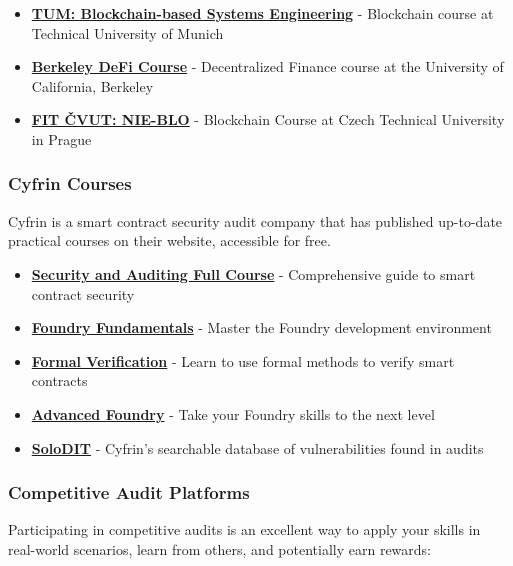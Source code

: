 \documentclass[12pt]{article}
\begin{document}
\begin{itemize}
    \item \textbf{\href{https://github.com/sebischair/bbse}{TUM: Blockchain-based Systems Engineering}} - Blockchain course at Technical University of Munich
    \item \textbf{\href{https://rdi.berkeley.edu/berkeley-defi/f24}{Berkeley DeFi Course}} - Decentralized Finance course at the University of California, Berkeley
    \item \textbf{\href{https://courses.fit.cvut.cz/NIE-BLO/index.html}{FIT ČVUT: NIE-BLO}} - Blockchain Course at Czech Technical University in Prague
\end{itemize}

\subsubsection*{Cyfrin Courses}

Cyfrin is a smart contract security audit company that has published up-to-date practical courses on their website, accessible for free.

\begin{itemize}
    \item \textbf{\href{https://updraft.cyfrin.io/courses/security}{Security and Auditing Full Course}} - Comprehensive guide to smart contract security
    \item \textbf{\href{https://updraft.cyfrin.io/courses/foundry}{Foundry Fundamentals}} - Master the Foundry development environment
    \item \textbf{\href{https://updraft.cyfrin.io/courses/formal-verification}{Formal Verification}} - Learn to use formal methods to verify smart contracts
    \item \textbf{\href{https://updraft.cyfrin.io/courses/advanced-foundry}{Advanced Foundry}} - Take your Foundry skills to the next level
    \item \textbf{\href{https://solodit.cyfrin.io/}{SoloDIT}} - Cyfrin's searchable database of vulnerabilities found in audits
\end{itemize}

\subsubsection*{Competitive Audit Platforms}

Participating in competitive audits is an excellent way to apply your skills in
real-world scenarios, learn from others, and potentially earn rewards:
\end{document}
